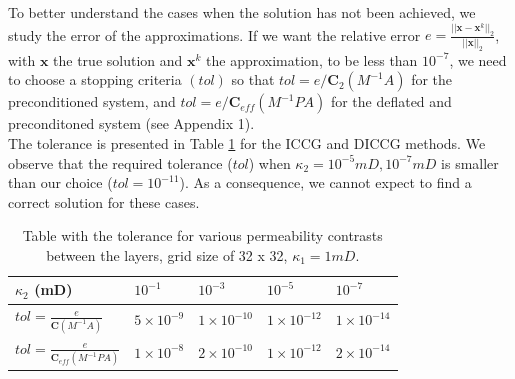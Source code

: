 \documentclass{ecmorXV}
\begin{document}
To better understand the cases when the solution has not been achieved, we study the error of the approximations.
If we want the relative error $e=\frac{||\mathbf{x}-\mathbf{x}^k||_2}{||\mathbf{x}||_2}$, with $\mathbf{x}$ the true
solution and $\mathbf{x}^k$ the approximation, to be less than $10^{-7}$, we need to choose a stopping criteria $(tol)$ 
so that $tol=e / \mathbf{C}_2(M^{-1}A)$ for the preconditioned system, and $tol=e  / \mathbf{C}_{eff}(M^{-1}PA)$ for the 
deflated and preconditoned system (see Appendix 1).\\ The tolerance is presented in Table \ref{table:tol} for the 
ICCG and DICCG methods. We observe that the required tolerance ($tol$) when $\kappa_2=10^{-5}mD, 10^{-7}mD$ is 
smaller than our choice ($tol= 10^{-11}$). As a consequence, we cannot expect to find a correct solution for these cases. 
\begin{table}[!ht]
\centering
\begin{tabular}{ |p{3cm}|p{1.5cm}|p{1.5cm}|p{1.5cm}|p{1.5cm}|  } 
 \hline
  $\kappa_2$ (mD) & $10^{-1}$& $10^{-3}$ & $10^{-5}$ & $10^{-7}$\\
  \hline
  $tol=\frac{e }{  \mathbf{C}(M^{-1}A)}$ &$5\times10^{-9}$&$1\times10^{-10}$&$1\times10^{-12}$&$1\times10^{-14}$\\
   \hline
 $tol=\frac{e}  { \mathbf{C}_{eff}(M^{-1}PA)}$ &$1\times10^{-8}$&$2\times10^{-10}$&$1\times10^{-12}$&$2\times10^{-14}$\\
\hline
\end{tabular}
\caption{Table with the tolerance for various permeability contrasts between the layers, grid size of 32 x 32, $\kappa_1=1mD$.}
\label{table:tol}
\end{table}
\end{document}
